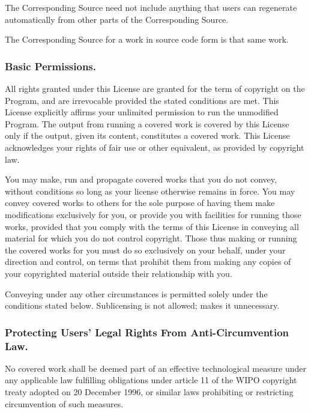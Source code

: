 \documentclass[10pt,english]{article}
\begin{document}
The Corresponding Source need not include anything that users can
regenerate automatically from other parts of the Corresponding Source.

The Corresponding Source for a work in source code form is that same
work.


\subsubsection{Basic Permissions.\label{sub:Basic-Permissions.}}

All rights granted under this License are granted for the term of
copyright on the Program, and are irrevocable provided the stated
conditions are met. This License explicitly affirms your unlimited
permission to run the unmodified Program. The output from running
a covered work is covered by this License only if the output, given
its content, constitutes a covered work. This License acknowledges
your rights of fair use or other equivalent, as provided by copyright
law.

You may make, run and propagate covered works that you do not convey,
without conditions so long as your license otherwise remains in force.
You may convey covered works to others for the sole purpose of having
them make modifications exclusively for you, or provide you with facilities
for running those works, provided that you comply with the terms of
this License in conveying all material for which you do not control
copyright. Those thus making or running the covered works for you
must do so exclusively on your behalf, under your direction and control,
on terms that prohibit them from making any copies of your copyrighted
material outside their relationship with you.

Conveying under any other circumstances is permitted solely under
the conditions stated below. Sublicensing is not allowed; 
makes it unnecessary.


\subsubsection{Protecting Users' Legal Rights From Anti-Circumvention Law.\label{sub:Protecting-Users'-Legal}}

No covered work shall be deemed part of an effective technological
measure under any applicable law fulfilling obligations under article
11 of the WIPO copyright treaty adopted on 20 December 1996, or similar
laws prohibiting or restricting circumvention of such measures.
\end{document}
